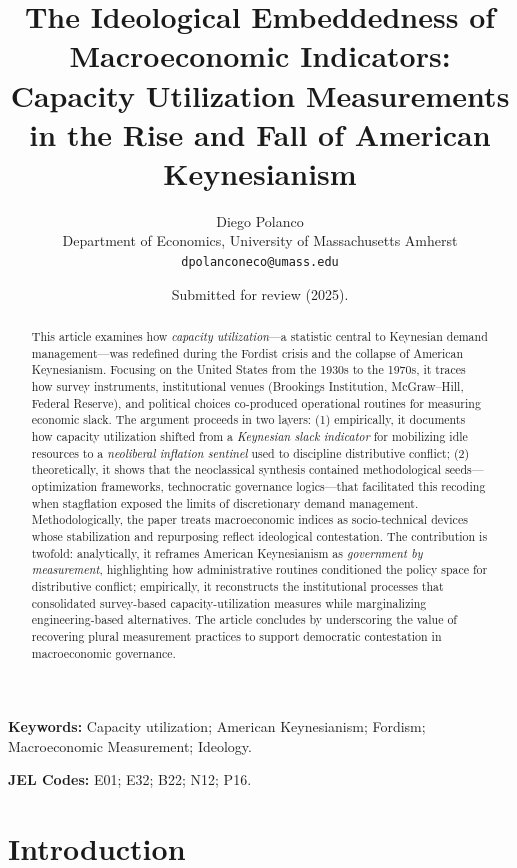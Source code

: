 \documentclass[11pt]{article}
\title{The Ideological Embeddedness of Macroeconomic Indicators: \\
Capacity Utilization Measurements in the Rise and Fall of American Keynesianism}
\author{Diego Polanco\\
Department of Economics, University of Massachusetts Amherst\\
\texttt{dpolanconeco@umass.edu}}
\date{Submitted for review (2025).}
\begin{document}
\maketitle

\begin{abstract}
This article examines how \textit{capacity utilization}---a statistic central to Keynesian demand management---was redefined during the Fordist crisis and the collapse of American Keynesianism. Focusing on the United States from the 1930s to the 1970s, it traces how survey instruments, institutional venues (Brookings Institution, McGraw--Hill, Federal Reserve), and political choices co-produced operational routines for measuring economic slack. The argument proceeds in two layers: (1) empirically, it documents how capacity utilization shifted from a \textit{Keynesian slack indicator} for mobilizing idle resources to a \textit{neoliberal inflation sentinel} used to discipline distributive conflict; (2) theoretically, it shows that the neoclassical synthesis contained methodological seeds---optimization frameworks, technocratic governance logics---that facilitated this recoding when stagflation exposed the limits of discretionary demand management. Methodologically, the paper treats macroeconomic indices as socio-technical devices whose stabilization and repurposing reflect ideological contestation. The contribution is twofold: analytically, it reframes American Keynesianism as \textit{government by measurement}, highlighting how administrative routines conditioned the policy space for distributive conflict; empirically, it reconstructs the institutional processes that consolidated survey-based capacity-utilization measures while marginalizing engineering-based alternatives. The article concludes by underscoring the value of recovering plural measurement practices to support democratic contestation in macroeconomic governance.
\end{abstract}

\vspace{1cm}


\noindent\textbf{Keywords:} Capacity utilization; American Keynesianism; Fordism; Macroeconomic Measurement; Ideology.

\noindent\textbf{JEL Codes:} E01; E32; B22; N12; P16.



\pagebreak

\section{Introduction}
\end{document}
